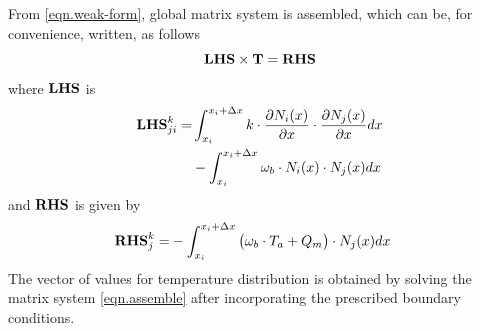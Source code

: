 \documentclass[conference]{IEEEtran}
\begin{document}
From \eqref{eqn.weak-form}, global matrix system is assembled, which can be, for convenience, written, as follows
\begin{equation}
\mbox{\textbf{LHS}} \times \mbox{\textbf{T}}= \mbox{\textbf{RHS}}
\label{eqn.assemble}
\end{equation}
where $\mbox{\textbf{LHS}}$ is
\begin{equation}
\begin{aligned}
   \mbox{\textbf{LHS}}_{ji}^k = &\int_{x_i}^{x_i + \Delta x}k \cdot \frac{\partial N_i(x)}{\partial x} \cdot \frac{\partial N_j(x)}{\partial x}dx \\
   &- \int_{x_i}^{x_i + \Delta x}\omega_b \cdot N_i(x) \cdot N_j(x)dx  
\end{aligned}
\label{eqn.lhs}
\end{equation}
and $\mbox{\textbf{RHS}}$ is given by
\begin{equation}
\begin{aligned}
   \mbox{\textbf{RHS}}_{j}^k = & - \int_{x_i}^{x_i + \Delta x}\big(\omega_b \cdot T_a + Q_m\big) \cdot  N_j(x)dx
\end{aligned}
\label{eqn.rhs}
\end{equation}
The vector of values for temperature distribution is obtained by solving the matrix system \eqref{eqn.assemble} after incorporating the prescribed boundary conditions.



\end{document}
